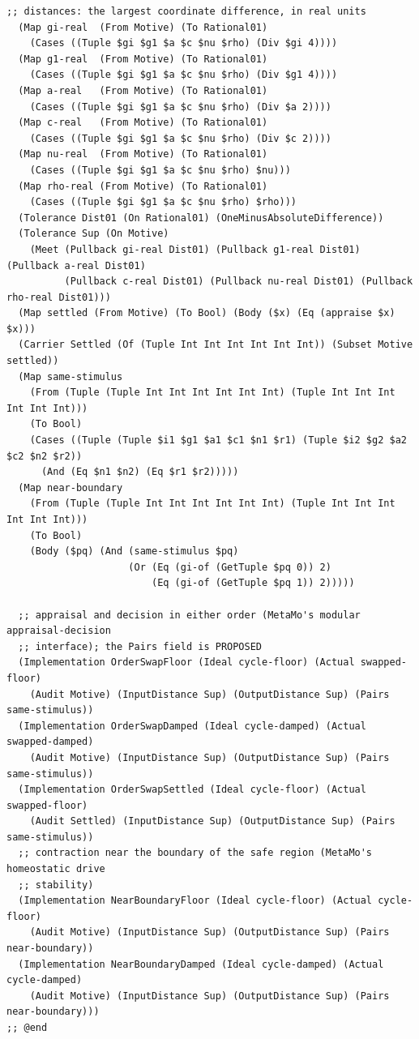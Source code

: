 \documentclass[11pt]{article}
\theoremstyle{definition}
\theoremstyle{plain}
\begin{document}
\begin{lstlisting}[style=mettafull]
  ;; distances: the largest coordinate difference, in real units
  (Map gi-real  (From Motive) (To Rational01)
    (Cases ((Tuple $gi $g1 $a $c $nu $rho) (Div $gi 4))))
  (Map g1-real  (From Motive) (To Rational01)
    (Cases ((Tuple $gi $g1 $a $c $nu $rho) (Div $g1 4))))
  (Map a-real   (From Motive) (To Rational01)
    (Cases ((Tuple $gi $g1 $a $c $nu $rho) (Div $a 2))))
  (Map c-real   (From Motive) (To Rational01)
    (Cases ((Tuple $gi $g1 $a $c $nu $rho) (Div $c 2))))
  (Map nu-real  (From Motive) (To Rational01)
    (Cases ((Tuple $gi $g1 $a $c $nu $rho) $nu)))
  (Map rho-real (From Motive) (To Rational01)
    (Cases ((Tuple $gi $g1 $a $c $nu $rho) $rho)))
  (Tolerance Dist01 (On Rational01) (OneMinusAbsoluteDifference))
  (Tolerance Sup (On Motive)
    (Meet (Pullback gi-real Dist01) (Pullback g1-real Dist01) (Pullback a-real Dist01)
          (Pullback c-real Dist01) (Pullback nu-real Dist01) (Pullback rho-real Dist01)))
  (Map settled (From Motive) (To Bool) (Body ($x) (Eq (appraise $x) $x)))
  (Carrier Settled (Of (Tuple Int Int Int Int Int Int)) (Subset Motive settled))
  (Map same-stimulus
    (From (Tuple (Tuple Int Int Int Int Int Int) (Tuple Int Int Int Int Int Int)))
    (To Bool)
    (Cases ((Tuple (Tuple $i1 $g1 $a1 $c1 $n1 $r1) (Tuple $i2 $g2 $a2 $c2 $n2 $r2))
      (And (Eq $n1 $n2) (Eq $r1 $r2)))))
  (Map near-boundary
    (From (Tuple (Tuple Int Int Int Int Int Int) (Tuple Int Int Int Int Int Int)))
    (To Bool)
    (Body ($pq) (And (same-stimulus $pq)
                     (Or (Eq (gi-of (GetTuple $pq 0)) 2)
                         (Eq (gi-of (GetTuple $pq 1)) 2)))))

  ;; appraisal and decision in either order (MetaMo's modular appraisal-decision
  ;; interface); the Pairs field is PROPOSED
  (Implementation OrderSwapFloor (Ideal cycle-floor) (Actual swapped-floor)
    (Audit Motive) (InputDistance Sup) (OutputDistance Sup) (Pairs same-stimulus))
  (Implementation OrderSwapDamped (Ideal cycle-damped) (Actual swapped-damped)
    (Audit Motive) (InputDistance Sup) (OutputDistance Sup) (Pairs same-stimulus))
  (Implementation OrderSwapSettled (Ideal cycle-floor) (Actual swapped-floor)
    (Audit Settled) (InputDistance Sup) (OutputDistance Sup) (Pairs same-stimulus))
  ;; contraction near the boundary of the safe region (MetaMo's homeostatic drive
  ;; stability)
  (Implementation NearBoundaryFloor (Ideal cycle-floor) (Actual cycle-floor)
    (Audit Motive) (InputDistance Sup) (OutputDistance Sup) (Pairs near-boundary))
  (Implementation NearBoundaryDamped (Ideal cycle-damped) (Actual cycle-damped)
    (Audit Motive) (InputDistance Sup) (OutputDistance Sup) (Pairs near-boundary)))
;; @end


\end{lstlisting}
\end{document}
